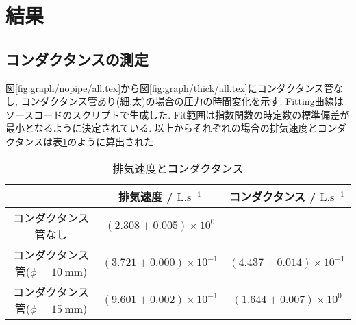 \section{結果}
\subsection{コンダクタンスの測定}
図\ref{fig:graph/nopipe/all.tex}から図\ref{fig:graph/thick/all.tex}にコンダクタンス管なし,
コンダクタンス管あり(細,太)の場合の圧力の時間変化を示す.
Fitting曲線はソースコードのスクリプトで生成した.
Fit範囲は指数関数の時定数の標準偏差が最小となるように決定されている.
以上からそれぞれの場合の排気速度とコンダクタンスは表\ref{tab:conduct}のように算出された.
\begin{table}[h]
\caption{排気速度とコンダクタンス}
\label{tab:conduct}
\centering
\begin{tabular}{ccc}
\hline
&排気速度 / $\si{\liter.\second^{-1}}$&コンダクタンス / $\si{\liter.\second^{-1}}$\\
\hline \hline
コンダクタンス管なし&$(2.308\pm 0.005)\times10^0$\\
コンダクタンス管($\phi=10\ \si{\milli\metre}$)&$(3.721\pm0.000)\times10^{-1}$&$(4.437\pm0.014)\times10^{-1}$\\
コンダクタンス管($\phi=15\ \si{\milli\metre}$)&$(9.601\pm0.002)\times10^{-1}$&$(1.644\pm0.007)\times10^0$\\
\hline
\end{tabular}
\end{table}
\newpage

